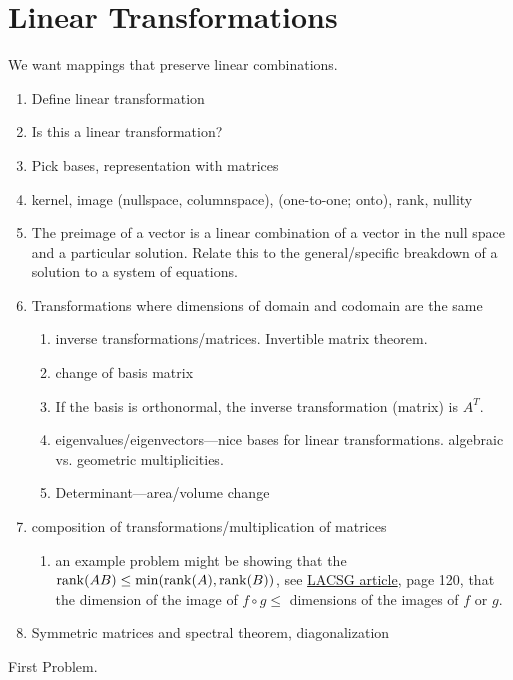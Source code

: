 \chapter{Linear Transformations}

We want mappings that preserve linear combinations.

\begin{enumerate}
\item Define linear transformation
\item Is this a linear transformation?
\item Pick bases, representation with matrices
\item kernel, image (nullspace, columnspace), (one-to-one; onto),
  rank, nullity
\item The preimage of a vector is a linear combination of a vector in
  the null space and a particular solution.  Relate this to the
  general/specific breakdown of a solution to a system of equations.
\item Transformations where dimensions of domain and codomain are the same
  \begin{enumerate}
  \item inverse transformations/matrices.  Invertible matrix theorem.
  \item change of basis matrix
  \item If the basis is orthonormal, the inverse transformation (matrix)
    is $A^T$.
  \item eigenvalues/eigenvectors---nice bases for linear
    transformations.  algebraic vs. geometric multiplicities.
  \item Determinant---area/volume change
  \end{enumerate}
\item composition of transformations/multiplication of matrices
  \begin{enumerate}
  \item an example problem might be showing that the $\operatorname{rank}(AB)\leq
    \min(\operatorname{rank}(A), \operatorname{rank}(B))$, see
    \href{http://www.math.ucsd.edu/~harel/Downloadable/The%20Linear%20Algebra%20Curriculum%20Study%20Group%20Recommendations%20-%20Moving%20Beyond%20Concept%20Definition.pdf}{LACSG article}, page 120, that the dimension of the image of $f\circ g \leq$ dimensions of the images of $f$ or $g$.
  \end{enumerate}
\item Symmetric matrices and spectral theorem, diagonalization
\end{enumerate}

\begin{problem}
  First Problem.
\end{problem}


